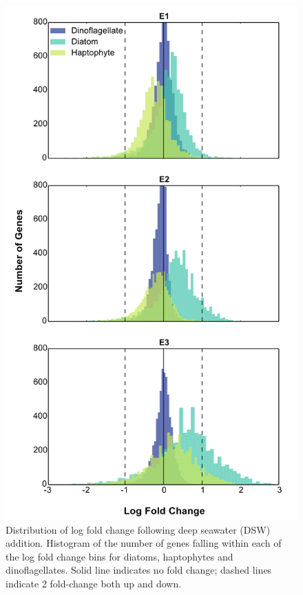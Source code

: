 \begin{figure}[p!]
  \centering
    \includegraphics[width=.75\textwidth]{Images/C4_FigureS4.png}
    \caption[Distribution of log fold change following deep seawater (DSW) addition]{Distribution of log fold change following deep seawater (DSW) addition. Histogram of the number of genes falling within each of the log fold change bins for diatoms, haptophytes and dinoflagellates. Solid line indicates no fold change; dashed lines indicate 2 fold-change both up and down.}
  \label{fig:a4f4}
\end{figure}



